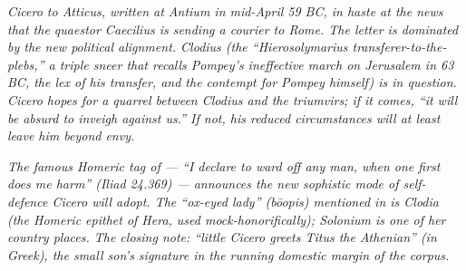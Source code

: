 
\textit{Cicero to Atticus, written at Antium in mid-April
59 BC, in haste at the news that the quaestor Caecilius is
sending a courier to Rome. The letter is dominated by the
new political alignment. Clodius (the ``Hierosolymarius
transferer-to-the-plebs,'' a triple sneer that recalls
Pompey's ineffective march on Jerusalem in 63 BC, the lex
of his transfer, and the contempt for Pompey himself) is
in question. Cicero hopes for a quarrel between Clodius
and the triumvirs; if it comes, ``it will be absurd to
inveigh against us.'' If not, his reduced circumstances
will at least leave him beyond envy.}

\textit{The famous Homeric tag of  ---
``I declare to ward off any man, when one first does me
harm'' (\textit{Iliad} 24.369) --- announces the new
sophistic mode of self-defence Cicero will adopt. The
``ox-eyed lady'' \textit{(b\=oopis)} mentioned in
 is Clodia (the Homeric epithet of Hera, used
mock-honorifically); Solonium is one of her country places.
The closing note: ``little Cicero greets Titus the
Athenian'' (in Greek), the small son's signature in the
running domestic margin of the corpus.}
